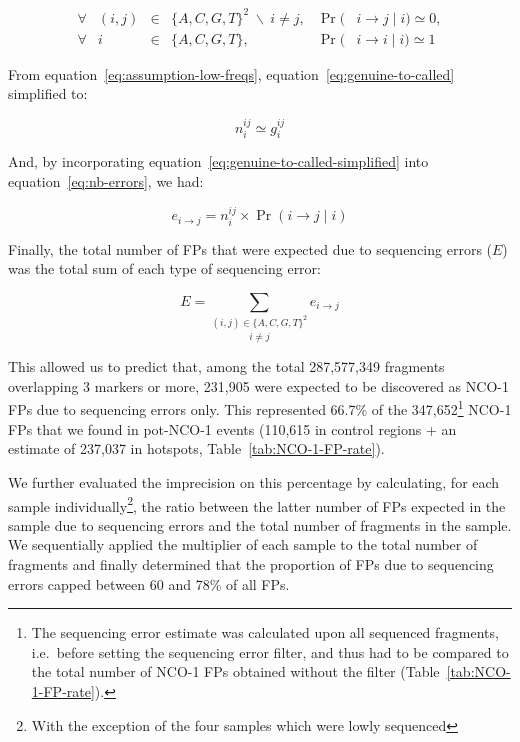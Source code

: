 \begin{subequations} 
	\begin{alignat}{5}
		\forall &(i,j) &{}\in{}& \{A, C, G, T\}^2 \; \backslash \: i \neq j, &{}\Pr({}& i\rightarrow j \mid i ) \simeq 0,\label{eq:assumption-low-freqs}\\
		\forall &i	   &{}\in{}& \{A, C, G, T\},							 &{}\Pr({}& i\rightarrow i \mid i ) \simeq 1
	\end{alignat}
\end{subequations}


From equation~\ref{eq:assumption-low-freqs}, equation~\ref{eq:genuine-to-called} simplified to:

\begin{equation} \label{eq:genuine-to-called-simplified}
	n_{i}^{ij} \simeq g_{i}^{ij}
\end{equation}

And, by incorporating equation~\ref{eq:genuine-to-called-simplified} into equation~\ref{eq:nb-errors}, we had:

\begin{equation*} \label{eq:nb-errors-with-only-known-parameters}
	e_{i\rightarrow j} = n_{i}^{ij} \times \Pr( i\rightarrow j \mid i )
\end{equation*}


Finally, the total number of FPs that were expected due to sequencing errors ($E$) was the total sum of each type of sequencing error: 

\begin{equation*} \label{eq:sum-all-NCOs-expected}
	E = \underset{i \neq j} {\sum_{(i, j) \in \{A, C, G, T\}^2}} e_{i\rightarrow j}
\end{equation*}




This allowed us to predict that, among the total 287,577,349 fragments overlapping 3 markers or more, 231,905 were expected to be discovered as NCO-1 FPs due to sequencing errors only.
This represented 66.7\% of the 347,652\footnote{The sequencing error estimate was calculated upon all sequenced fragments, i.e.\ before setting the sequencing error filter, and thus had to be compared to the total number of NCO-1 FPs obtained without the filter (Table~\ref{tab:NCO-1-FP-rate}).} NCO-1 FPs that we found in pot-NCO-1 events (110,615 in control regions + an estimate of 237,037 in hotspots, Table~\ref{tab:NCO-1-FP-rate}).

We further evaluated the imprecision on this percentage by calculating, for each sample individually\footnote{With the exception of the four samples which were lowly sequenced}, the ratio between the latter number of FPs expected in the sample due to sequencing errors and the total number of fragments in the sample. 
We sequentially applied the multiplier of each sample to the total number of fragments and finally determined that the proportion of FPs due to sequencing errors capped between 60 and 78\% of all FPs.\\


